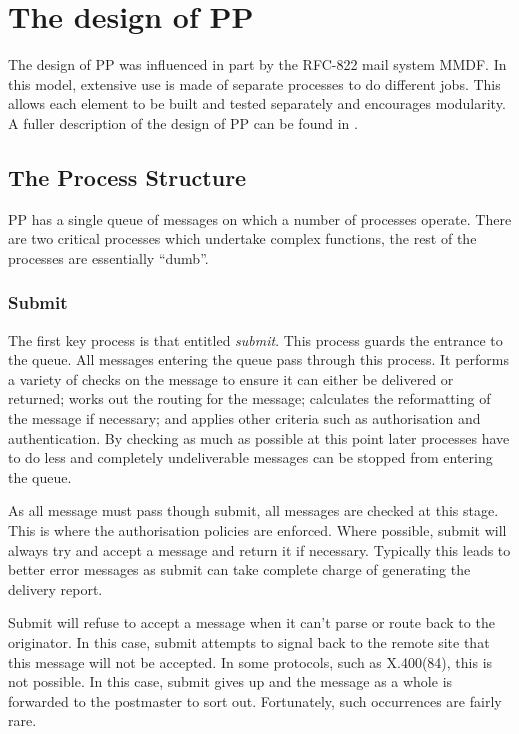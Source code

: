 \section{The design of PP}

The design of PP was influenced in part by the RFC-822 mail system
MMDF\cite{MMDFII}. In this model, extensive use is made of separate
processes to do different jobs. This allows each element to be built
and tested separately and encourages modularity. A fuller description
of the design of PP can be found in \cite{PP.MTA}.

\subsection{The Process Structure}

PP has a single queue of messages on which a number of processes
operate.  There are two critical processes which undertake complex
functions, the rest of the processes are essentially ``dumb''.

\subsubsection{Submit}
The first key process is that entitled {\em submit}. This process
guards the entrance to the queue. All messages entering the queue pass
through this process. It performs a variety of checks on the message
to ensure it can either be delivered or returned; works out the
routing for the message; calculates the reformatting of the message if
necessary; and applies other criteria such as authorisation and
authentication. By checking as much as possible at this point later
processes have to do less and completely undeliverable messages can be
stopped from entering the queue. 

As all message must pass though submit, all messages are checked at
this stage. This is where the authorisation policies are enforced.
Where possible, submit will always try and accept a message and return
it if necessary. Typically this leads to better error messages as
submit can take complete charge of generating the delivery report. 

Submit will refuse to accept a message when it can't parse or route
back to the originator. In this case, submit attempts to signal back
to the remote site that this message will not be accepted. In some
protocols, such as X.400(84), this is not possible. In this case,
submit gives up and the message as a whole is forwarded to the
postmaster to sort out. Fortunately, such occurrences are fairly rare.

